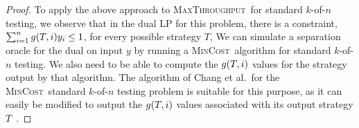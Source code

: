 \documentclass{article}
\newcounter{ass}
\newcommand{\ens}[1]{\ensuremath{#1}}					\newcommand{\card}[1]{\ens{|#1|}}							\newcommand{\dotlist}[2]{\ens{#1,\ldots,#2}}
\newcommand{\valn}{\ens{n}}
\newcommand{\valk}{\ens{k}}
\newcommand{\maxthru}{\textsc{MaxThroughput}}
\newcommand{\mincost}{\textsc{MinCost}}
\newcommand{\kofn}{\valk-of-\valn}
\newcommand{\strategy}{\ens{T}}
\begin{document}
\begin{proof}
To apply the above approach to \maxthru\ for standard \kofn{} testing,
we observe that in the dual LP for this problem,
there is a constraint, 
$\sum_{i=1}^n \landprob{\strategy}{i}\vary{i} \leq 1$,
for every possible strategy $\strategy$,
We can simulate a separation
oracle for the dual on input $y$ by
running a \mincost\ algorithm for standard \kofn{} testing.
We also need to be able to compute the $\landprob{\strategy}{i}$ values for the
strategy output by that algorithm.
The algorithm of 
Chang et al.~for the \mincost\ standard \kofn{} testing problem is suitable for this purpose,
as it can easily be modified to output
the $\landprob{\strategy}{i}$ values associated with its output strategy \strategy~\cite{journals/tc/ChangSF90}. 
\end{proof}



\end{document}
